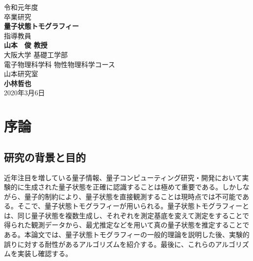 \documentclass[11pt,a4j,notitlepage]{jreport}
\def\HUGE{\fontsize{32pt}{36pt}\selectfont} %
\begin{document}
\begin{titlepage}
\begin{center}\begin{LARGE}
\vspace*{1em}
{令和元年度}\vspace{1em}\\
\vspace*{1em}
{卒業研究}\vspace{1em}\\
\textbf{\HUGE 量子状態トモグラフィー}\\
\vspace{4em}
{\LARGE 指導教員}\\
\vspace{0.8em}
{\Huge\bf 山本　俊 教授}\\
\vspace{0.3\vsize}
{大阪大学 基礎工学部\\ 電子物理科学科 物性物理科学コース\\ 山本研究室}\\
\vspace{0.8em}
{\Huge\bf 小林哲也}\\
\vspace{1em}
{\Large 2020年3月6日}
\end{LARGE}\end{center}
\end{titlepage}


\setcounter{tocdepth}{2}
\tableofcontents

\clearpage

\listoffigures

\clearpage
{}


\chapter{序論}
\section{研究の背景と目的}
近年注目を増している量子情報、量子コンピューティング研究・開発において実験的に生成された量子状態を正確に認識することは極めて重要である。しかしながら、量子的制約により、量子状態を直接観測することは現時点では不可能である。そこで、量子状態トモグラフィーが用いられる。量子状態トモグラフィーとは、同じ量子状態を複数生成し、それぞれを測定基底を変えて測定をすることで得られた観測データから、最尤推定などを用いて真の量子状態を推定することである。本論文では、量子状態トモグラフィーの一般的理論を説明した後、実験的誤りに対する耐性があるアルゴリズムを紹介する。最後に、これらのアルゴリズムを実装し確認する。
\end{document}
